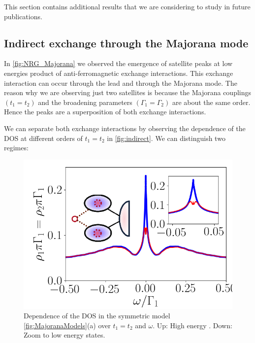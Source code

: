 This section contains additional results that we are considering to study in  future publications. 

\subsection{Indirect exchange through the Majorana mode}

In \ref{fig:NRG_Majorana} we observed the emergence of satellite peaks at low energies product of anti-ferromagnetic exchange interactions. This exchange interaction can occur through the lead and through the Majorana mode. The reason why we are observing just two satellites is because the Majorana  couplings $(t_1=t_2)$ and the broadening parameters $(\Gamma_1 = \Gamma_2)$ are about the same order. Hence the peaks are a superposition of both exchange interactions. 

We can separate both exchange interactions by observing the dependence of the DOS at different orders of $t_1=t_2$ in \ref{fig:indirect}. We can distinguish two regimes:

\begin{figure}[t]
\centering
\includegraphics[scale=0.5]{IMAGES/NRG/Lowt1=t2.png}
\caption{ \label{fig:indirectLow} Dependence of the DOS in the symmetric model \ref{fig:MajoranaModels}(a) over $t_1=t_2$ and $\omega$. Up: High energy . Down: Zoom to low energy states.  \protect\Source{}}
\end{figure}

